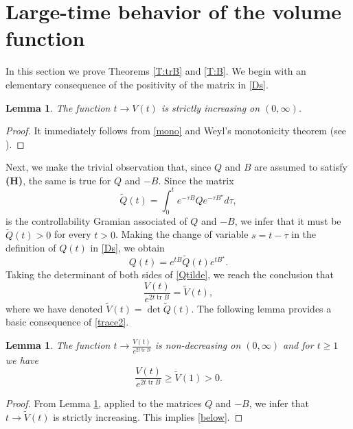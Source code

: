 \documentclass[11pt,letter]{amsart}
\numberwithin{equation}{section}
\newcommand{\tr}{\operatorname{tr}}
\newtheorem{lemma}[theorem]{Lemma}
\numberwithin{equation}{section}
\begin{document}
\section{Large-time behavior of the volume function}\label{S:volume}

In this section we prove Theorems \ref{T:trB} and \ref{T:B}. 
We begin with an elementary consequence of the positivity of the matrix in \eqref{Ds}.

\begin{lemma}\label{L:log}
The function $t\to V(t)$ is strictly increasing on $(0,\infty)$.
\end{lemma}

\begin{proof}
It immediately follows from \eqref{mono} and  Weyl's monotonicity theorem (see \cite[Cor.8.4.10,(iv)]{Bernie}).

\end{proof}

Next, we make the trivial observation that, since $Q$ and $B$ are assumed to satisfy \textbf{(H)}, the same is true for $Q$ and $-B$. Since the matrix
\begin{equation}\label{tQ}
\tilde Q(t) = \int_0^t e^{-\tau B} Q e^{-\tau B^\star} d\tau,
\end{equation}
is the controllability Gramian associated of $Q$ and $-B$, we infer that it must be $\tilde Q(t)>0$ for every $t>0$. Making the change of variable $s = t-\tau$ in the definition of $Q(t)$ in \eqref{Ds}, we obtain
\begin{equation}\label{Qtilde}
Q(t) = e^{tB} \tilde Q(t) e^{tB^\star}.
\end{equation}
Taking the determinant of both sides of \eqref{Qtilde}, we reach the conclusion that 
\begin{equation}\label{trace2}
\frac{V(t)}{e^{2 t \tr B}} = \tilde V(t),
\end{equation}
where we have denoted $\tilde V(t) = \det \tilde Q(t)$.
The following lemma provides a basic consequence of \eqref{trace2}.

\begin{lemma}\label{L:ber}
The function $t\to \frac{V(t)}{e^{2 t \tr B}}$ is non-decreasing on $(0,\infty)$ and for $t\ge 1$ we have  
\begin{equation}\label{below}
\frac{V(t)}{e^{2 t \tr B}} \ge \tilde V(1)>0.
\end{equation}
\end{lemma}

\begin{proof}
From Lemma \ref{L:log}, applied to the matrices $Q$ and $-B$, we infer that $t\to \tilde V(t)$ is strictly increasing. This implies \eqref{below}. 



\end{proof}
\end{document}
